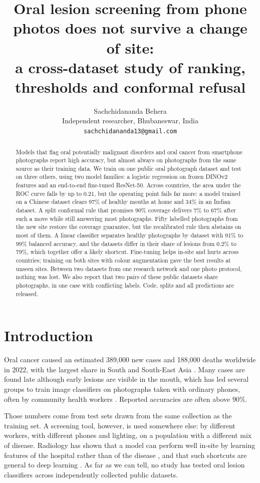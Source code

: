 \documentclass[11pt]{article}
\title{Oral lesion screening from phone photos does not survive a change of site:\\a cross-dataset study of ranking, thresholds and conformal refusal}
\author{Sachchidananda Behera\\
Independent researcher, Bhubaneswar, India\\
\texttt{sachchidananda13@gmail.com}}
\date{}
\begin{document}
\maketitle

\begin{abstract}
Models that flag oral potentially malignant disorders and oral cancer from smartphone photographs report high accuracy, but almost always on photographs from the same source as their training data. We train on one public oral photograph dataset and test on three others, using two model families: a logistic regression on frozen DINOv2 features and an end-to-end fine-tuned ResNet-50. Across countries, the area under the ROC curve falls by up to 0.21, but the operating point fails far more: a model trained on a Chinese dataset clears 97\% of healthy mouths at home and 34\% in an Indian dataset. A split conformal rule that promises 90\% coverage delivers 7\% to 67\% after such a move while still answering most photographs. Fifty labelled photographs from the new site restore the coverage guarantee, but the recalibrated rule then abstains on most of them. A linear classifier separates healthy photographs by dataset with 91\% to 99\% balanced accuracy, and the datasets differ in their share of lesions from 0.2\% to 79\%, which together offer a likely shortcut. Fine-tuning helps in-site and hurts across countries; training on both sites with colour augmentation gave the best results at unseen sites. Between two datasets from one research network and one photo protocol, nothing was lost. We also report that two pairs of these public datasets share photographs, in one case with conflicting labels. Code, splits and all predictions are released.
\end{abstract}

\section{Introduction}

Oral cancer caused an estimated 389{,}000 new cases and 188{,}000 deaths worldwide in 2022, with the largest share in South and South-East Asia \citep{bray2024globocan}. Many cases are found late although early lesions are visible in the mouth, which has led several groups to train image classifiers on photographs taken with ordinary phones, often by community health workers \citep{talwar2023smartphone, piyarathne2024dataset, yu2026opmd}. Reported accuracies are often above 90\%.

Those numbers come from test sets drawn from the same collection as the training set. A screening tool, however, is used somewhere else: by different workers, with different phones and lighting, on a population with a different mix of disease. Radiology has shown that a model can perform well in-site by learning features of the hospital rather than of the disease \citep{zech2018variable, degrave2021shortcuts}, and that such shortcuts are general to deep learning \citep{geirhos2020shortcut}. As far as we can tell, no study has tested oral lesion classifiers across independently collected public datasets.
\end{document}
